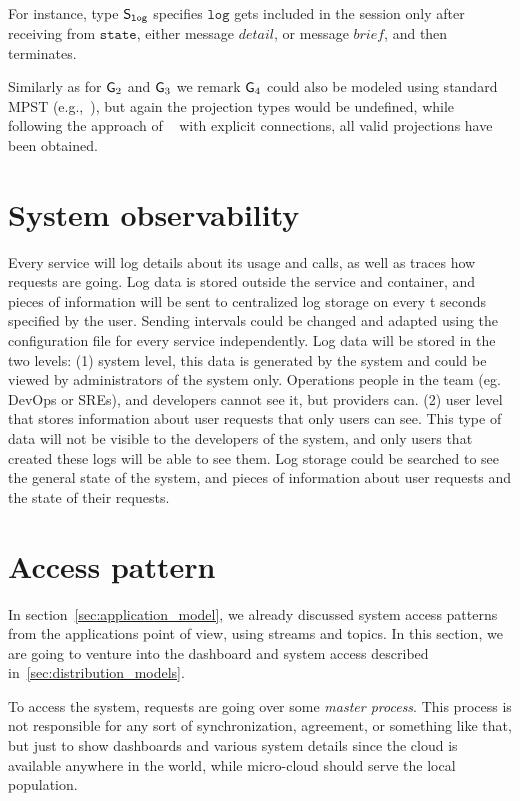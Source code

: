 \noindent
For instance, type ${\mathsf S}_\mathtt{log}$ specifies $\mathtt{log}$ gets included in the session only after receiving from $\mathtt{state}$, either message $\mathit{detail}$, or message $\mathit{brief}$, and then terminates. 

Similarly as for ${\sf G}_2$ and ${\sf G}_3$ we remark ${\sf G}_4$ could also be modeled using standard MPST (e.g.,~\cite{HondaYC08}), but again the projection types would be undefined, while following the approach of ~\cite{HuY17} with explicit connections, all valid projections have been obtained.
%
%
\section{System observability}\label{sec:system_observability}
%
Every service will log details about its usage and calls, as well as traces how requests are going. Log data is stored outside the service and container, and pieces of information will be sent to centralized log storage on every t seconds specified by the user. Sending intervals could be changed and adapted using the configuration file for every service independently.
Log data will be stored in the two levels:
(1) system level, this data is generated by the system and could be viewed by administrators of the system only. Operations people in the team (eg. DevOps or SREs), and developers cannot see it, but providers can.
(2) user level that stores information about user requests that only users can see. This type of data will not be visible to the developers of the system, and only users that created these logs will be able to see them.
Log storage could be searched to see the general state of the system, and pieces of information about user requests and the state of their requests.
%
%
\section{Access pattern}\label{sec:access_pattern}
%
In section~\ref{sec:application_model}, we already discussed system access patterns from the applications point of view, using streams and topics. In this section, we are going to venture into the dashboard and system access described in~\ref{sec:distribution_models}. 

To access the system, requests are going over some \textit{master process}. This process is not responsible for any sort of synchronization, agreement, or something like that, but just to show dashboards and various system details since the cloud is available anywhere in the world, while micro-cloud should serve the local population. 

